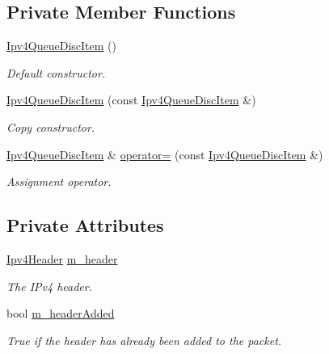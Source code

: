\subsection*{Private Member Functions}
\begin{DoxyCompactItemize}
\item 
\hyperlink{classns3_1_1Ipv4QueueDiscItem_a12bc7e8889cc0b325e667e9853fffe48}{Ipv4\+Queue\+Disc\+Item} ()
\begin{DoxyCompactList}\small\item\em Default constructor. \end{DoxyCompactList}\item 
\hyperlink{classns3_1_1Ipv4QueueDiscItem_a1396f18bf74e9813c99a1eb2ace48c7e}{Ipv4\+Queue\+Disc\+Item} (const \hyperlink{classns3_1_1Ipv4QueueDiscItem}{Ipv4\+Queue\+Disc\+Item} \&)
\begin{DoxyCompactList}\small\item\em Copy constructor. \end{DoxyCompactList}\item 
\hyperlink{classns3_1_1Ipv4QueueDiscItem}{Ipv4\+Queue\+Disc\+Item} \& \hyperlink{classns3_1_1Ipv4QueueDiscItem_a7c0e0fa4c7081684bd2fb251ee067527}{operator=} (const \hyperlink{classns3_1_1Ipv4QueueDiscItem}{Ipv4\+Queue\+Disc\+Item} \&)
\begin{DoxyCompactList}\small\item\em Assignment operator. \end{DoxyCompactList}\end{DoxyCompactItemize}
\subsection*{Private Attributes}
\begin{DoxyCompactItemize}
\item 
\hyperlink{classns3_1_1Ipv4Header}{Ipv4\+Header} \hyperlink{classns3_1_1Ipv4QueueDiscItem_a26c48ea7da60a1a7c21d00c5171ed570}{m\+\_\+header}
\begin{DoxyCompactList}\small\item\em The I\+Pv4 header. \end{DoxyCompactList}\item 
bool \hyperlink{classns3_1_1Ipv4QueueDiscItem_a04c1067a2893d8b5b6cf2c98d083d0c7}{m\+\_\+header\+Added}
\begin{DoxyCompactList}\small\item\em True if the header has already been added to the packet. \end{DoxyCompactList}\end{DoxyCompactItemize}
